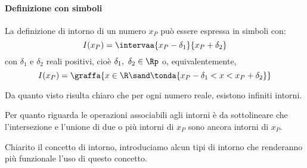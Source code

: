 % 

\paragraph{Definizione con simboli}

La definizione di intorno di un numero \(x_P\) può essere espressa in simboli 
con:
\[I(x_P)=\intervaa{x_P-\delta_1}{x_P+\delta_2}\]
con \(\delta_1\) e \(\delta_2\) reali positivi, cioè 
\(\delta_1,~ \delta_2 \in \Rp\) o, equivalentemente,
\[%
I(x_P)=\graffa{x \in \R \sand \tonda{x_P-\delta_1 < x < x_P+\delta_2}}\]

\begin{center} \intorno \end{center}


Da quanto visto risulta chiaro che per ogni numero reale, esistono infiniti 
intorni.

\begin{center} \intorniuno \end{center}

Per quanto riguarda le operazioni associabili agli intorni è da sottolineare 
che l'intersezione e l'unione di due o più intorni di \(x_P\) sono ancora 
intorni di \(x_P\).

  
Chiarito il concetto di intorno, introduciamo alcun tipi di 
intorno che renderanno più funzionale l'uso di questo concetto. 

